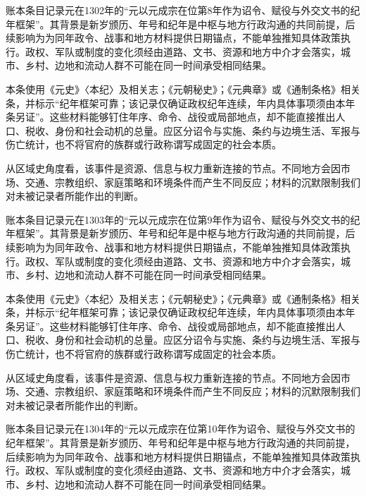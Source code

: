 账本条目记录元在1302年的“元以元成宗在位第8年作为诏令、赋役与外交文书的纪年框架”。其背景是新岁颁历、年号和纪年是中枢与地方行政沟通的共同前提，后续影响为为同年政令、战事和地方材料提供日期锚点，不能单独推知具体政策执行。政权、军队或制度的变化须经由道路、文书、资源和地方中介才会落实，城市、乡村、边地和流动人群不可能在同一时间承受相同结果。

本条使用《元史》〈本纪〉及相关志；《元朝秘史》；《元典章》或《通制条格》相关条，并标示“纪年框架可靠；该记录仅确证政权纪年连续，年内具体事项须由本年条另证”。这些材料能够钉住年序、命令、战役或局部地点，却不能直接推出人口、税收、身份和社会动机的总量。应区分诏令与实施、条约与边境生活、军报与伤亡统计，也不将官府的族群或行政称谓写成固定的社会本质。

从区域史角度看，该事件是资源、信息与权力重新连接的节点。不同地方会因市场、交通、宗教组织、家庭策略和环境条件而产生不同反应；材料的沉默限制我们对未被记录者所能作出的判断。

账本条目记录元在1303年的“元以元成宗在位第9年作为诏令、赋役与外交文书的纪年框架”。其背景是新岁颁历、年号和纪年是中枢与地方行政沟通的共同前提，后续影响为为同年政令、战事和地方材料提供日期锚点，不能单独推知具体政策执行。政权、军队或制度的变化须经由道路、文书、资源和地方中介才会落实，城市、乡村、边地和流动人群不可能在同一时间承受相同结果。

本条使用《元史》〈本纪〉及相关志；《元朝秘史》；《元典章》或《通制条格》相关条，并标示“纪年框架可靠；该记录仅确证政权纪年连续，年内具体事项须由本年条另证”。这些材料能够钉住年序、命令、战役或局部地点，却不能直接推出人口、税收、身份和社会动机的总量。应区分诏令与实施、条约与边境生活、军报与伤亡统计，也不将官府的族群或行政称谓写成固定的社会本质。

从区域史角度看，该事件是资源、信息与权力重新连接的节点。不同地方会因市场、交通、宗教组织、家庭策略和环境条件而产生不同反应；材料的沉默限制我们对未被记录者所能作出的判断。

账本条目记录元在1304年的“元以元成宗在位第10年作为诏令、赋役与外交文书的纪年框架”。其背景是新岁颁历、年号和纪年是中枢与地方行政沟通的共同前提，后续影响为为同年政令、战事和地方材料提供日期锚点，不能单独推知具体政策执行。政权、军队或制度的变化须经由道路、文书、资源和地方中介才会落实，城市、乡村、边地和流动人群不可能在同一时间承受相同结果。

